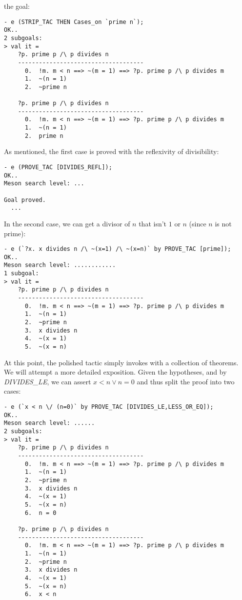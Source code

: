 the goal:
\begin{session}\begin{verbatim}
- e (STRIP_TAC THEN Cases_on `prime n`);
OK..
2 subgoals:
> val it =
    ?p. prime p /\ p divides n
    ------------------------------------
      0.  !m. m < n ==> ~(m = 1) ==> ?p. prime p /\ p divides m
      1.  ~(n = 1)
      2.  ~prime n

    ?p. prime p /\ p divides n
    ------------------------------------
      0.  !m. m < n ==> ~(m = 1) ==> ?p. prime p /\ p divides m
      1.  ~(n = 1)
      2.  prime n
\end{verbatim}\end{session}
\noindent As mentioned, the first case is proved with the reflexivity of
divisibility:
\begin{session}\begin{verbatim}
- e (PROVE_TAC [DIVIDES_REFL]);
OK..
Meson search level: ...

Goal proved.
  ...
\end{verbatim}\end{session}
\noindent
In the second case, we can get a divisor of $n$ that isn't $1$ or $n$
(since $n$ is not prime):
\begin{session}\begin{verbatim}
- e (`?x. x divides n /\ ~(x=1) /\ ~(x=n)` by PROVE_TAC [prime]);
OK..
Meson search level: ............
1 subgoal:
> val it =
    ?p. prime p /\ p divides n
    ------------------------------------
      0.  !m. m < n ==> ~(m = 1) ==> ?p. prime p /\ p divides m
      1.  ~(n = 1)
      2.  ~prime n
      3.  x divides n
      4.  ~(x = 1)
      5.  ~(x = n)
\end{verbatim}\end{session}
At this point, the polished tactic simply invokes  with
a collection of theorems. We will attempt a more detailed
exposition. Given the hypotheses, and by {\small\it DIVIDES\_LE}, we can
assert $x < n \lor n = 0$ and thus split the proof into two cases:
\begin{session}\begin{verbatim}
- e (`x < n \/ (n=0)` by PROVE_TAC [DIVIDES_LE,LESS_OR_EQ]);
OK..
Meson search level: ......
2 subgoals:
> val it =
    ?p. prime p /\ p divides n
    ------------------------------------
      0.  !m. m < n ==> ~(m = 1) ==> ?p. prime p /\ p divides m
      1.  ~(n = 1)
      2.  ~prime n
      3.  x divides n
      4.  ~(x = 1)
      5.  ~(x = n)
      6.  n = 0

    ?p. prime p /\ p divides n
    ------------------------------------
      0.  !m. m < n ==> ~(m = 1) ==> ?p. prime p /\ p divides m
      1.  ~(n = 1)
      2.  ~prime n
      3.  x divides n
      4.  ~(x = 1)
      5.  ~(x = n)
      6.  x < n
\end{verbatim}\end{session}
